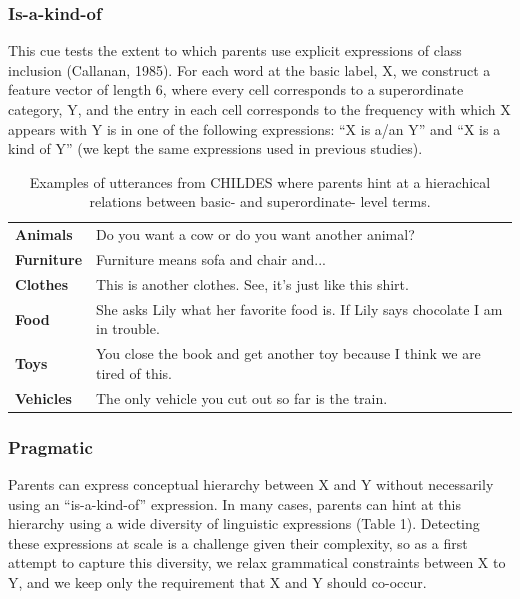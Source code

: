 \documentclass[10pt, letterpaper]{article}
\begin{document}
\hypertarget{is-a-kind-of}{%
\subsubsection{Is-a-kind-of}\label{is-a-kind-of}}

This cue tests the extent to which parents use explicit expressions of
class inclusion (Callanan, 1985). For each word at the basic label, X,
we construct a feature vector of length 6, where every cell corresponds
to a superordinate category, Y, and the entry in each cell corresponds
to the frequency with which X appears with Y is in one of the following
expressions: ``X is a/an Y'' and ``X is a kind of Y'' (we kept the same
expressions used in previous studies).

\begin{table}[!htbp] \centering 
\begin{tabular}{l p{}}
\hline

\textbf{Animals} & Do you want a cow or do you want another animal?\\

\textbf{Furniture} & Furniture means sofa and chair and...\\

\textbf{Clothes} & This is another clothes. See, it's just like this shirt.\\

\textbf{Food}   & She asks Lily what her favorite food is. If Lily says chocolate I am in trouble. \\

\textbf{Toys} & You close the book and get another toy because I think we are tired of this.\\

\textbf{Vehicles} & The only vehicle you cut out so far is the train.\\

\hline
\end{tabular}
\caption{\label{tab:pragmatic} Examples of utterances from CHILDES where parents hint at a hierachical relations between basic- and superordinate- level terms.}
\end{table}

\hypertarget{pragmatic}{%
\subsubsection{Pragmatic}\label{pragmatic}}

Parents can express conceptual hierarchy between X and Y without
necessarily using an ``is-a-kind-of'' expression. In many cases, parents
can hint at this hierarchy using a wide diversity of linguistic
expressions (Table 1). Detecting these expressions at scale is a
challenge given their complexity, so as a first attempt to capture this
diversity, we relax grammatical constraints between X to Y, and we keep
only the requirement that X and Y should co-occur.
\end{document}
